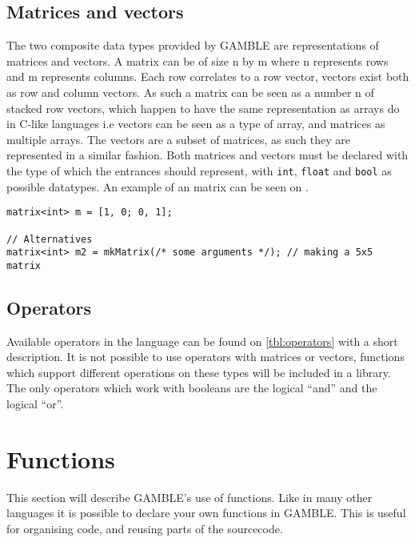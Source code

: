 \subsection*{Matrices and vectors}
The two composite data types provided by GAMBLE are representations of matrices and vectors.
A matrix can be of size n by m where n represents rows and m represents columns.
Each row correlates to a row vector, vectors exist both as row and column vectors.
As such a matrix can be seen as a number n of stacked row vectors, which happen to have the same representation as arrays do in C-like languages i.e vectors can be seen as a type of array, and matrices as multiple arrays.
The vectors are a subset of matrices, as such they are represented in a similar fashion.
Both matrices and vectors must be declared with the type of which the entrances should represent, with \texttt{int}, \texttt{float} and \texttt{bool} as possible datatypes.
An example of an matrix can be seen on .

\begin{lstlisting}[caption={Creating a matrix},label={lst:matrix}]
matrix<int> m = [1, 0; 0, 1];

// Alternatives
matrix<int> m2 = mkMatrix(/* some arguments */); // making a 5x5 matrix
\end{lstlisting}

\subsection*{Operators}
Available operators in the language can be found on \ref{tbl:operators} with a short description.  
It is not possible to use operators with matrices or vectors, functions which support different operations on these types will be included in a library.
The only operators which work with booleans are the logical ``and'' and the logical ``or''. 


\section{Functions}
This section will describe GAMBLE's use of functions. 
Like in many other languages it is possible to declare your own functions in GAMBLE.
This is useful for organising code, and reusing parts of the sourcecode.

